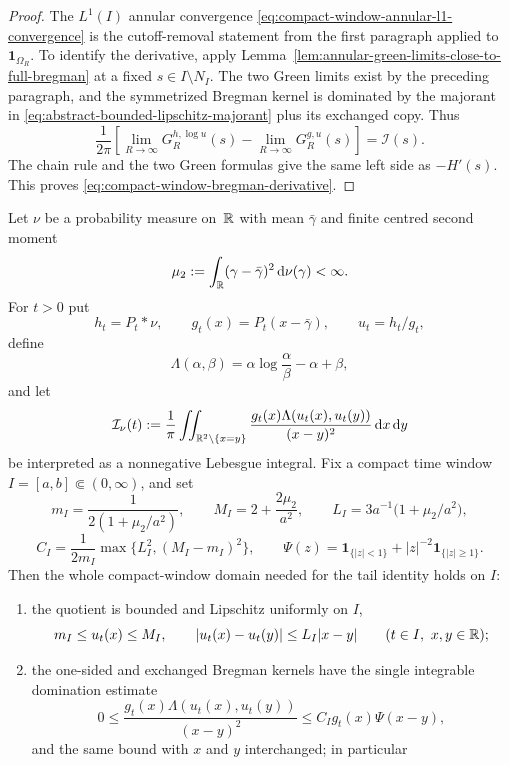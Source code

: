 \begin{proof}
The \(L^1(I)\) annular convergence
\eqref{eq:compact-window-annular-l1-convergence} is the cutoff-removal
statement from the first paragraph applied to \(\mathbf1_{\Omega_R}\).  To
identify the derivative, apply
Lemma~\ref{lem:annular-green-limits-close-to-full-bregman} at a fixed
\(s\in I\setminus N_I\).  The two Green limits exist by the preceding
paragraph, and the symmetrized Bregman kernel is dominated by the majorant in
\eqref{eq:abstract-bounded-lipschitz-majorant} plus its exchanged copy.  Thus
\[
\frac1{2\pi}
\left[
\lim_{R\to\infty}G_R^{h,\log u}(s)
-\lim_{R\to\infty}G_R^{g,u}(s)
\right]
=\mathscr I(s).
\]
The chain rule and the two Green formulas give the same left side as
\(-H'(s)\).  This proves \eqref{eq:compact-window-bregman-derivative}.
\end{proof}

\begin{proposition}%
\label{prop:main-C-domain-differentiation-package}
Let \(\nu\) be a probability measure on~\(\mathbb{R}\) with mean \(\bar\gamma\) and
finite centred second moment
\[
\mu_2:=\int_{\mathbb{R}}(\gamma-\bar\gamma)^2\,\mathrm{d}\nu(\gamma)<\infty .
\]
For \(t>0\) put
\[
h_t=P_t*\nu,\qquad
g_t(x)=P_t(x-\bar\gamma),\qquad
u_t=h_t/g_t,
\]
define
\[
\Lambda(\alpha,\beta)=\alpha\log\frac{\alpha}{\beta}-\alpha+\beta,
\]
and let
\[
\mathcal I_\nu(t):=\frac1\pi\iint_{\mathbb{R}^2\setminus\{x=y\}}
\frac{g_t(x)\Lambda(u_t(x),u_t(y))}{(x-y)^2}\,\mathrm{d} x\,\mathrm{d} y
\]
be interpreted as a nonnegative Lebesgue integral.  Fix a compact time
window \(I=[a,b]\Subset(0,\infty)\), and set
\[
m_I=\frac1{2(1+\mu_2/a^2)},\qquad
M_I=2+\frac{2\mu_2}{a^2},\qquad
L_I=3a^{-1}\bigl(1+\mu_2/a^2\bigr),
\]
\[
C_I=\frac{1}{2m_I}\max\{L_I^2,(M_I-m_I)^2\},
\qquad
\Psi(z)=\mathbf1_{\{|z|<1\}}+|z|^{-2}\mathbf1_{\{|z|\ge1\}} .
\]
Then the whole compact-window domain needed for the tail identity holds on
\(I\):
\begin{enumerate}
\item the quotient is bounded and Lipschitz uniformly on \(I\),
\[
m_I\le u_t(x)\le M_I,\qquad
|u_t(x)-u_t(y)|\le L_I|x-y|
\qquad(t\in I,\ x,y\in\mathbb{R});
\]
\item the one-sided and exchanged Bregman kernels have the single integrable
domination estimate
\begin{equation}\label{eq:main-C-domain-package-domination}
0\le
\frac{g_t(x)\Lambda(u_t(x),u_t(y))}{(x-y)^2}
\le C_I g_t(x)\Psi(x-y),
\end{equation}
and the same bound with \(x\) and \(y\) interchanged; in particular

\end{enumerate}
\end{proposition}
